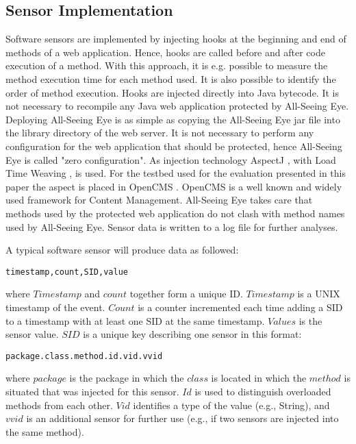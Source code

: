 \documentclass[conference]{IEEEtran}
\begin{document}
\subsection{Sensor Implementation}
Software sensors are implemented by injecting hooks at the beginning and end of methods of a web application. Hence, hooks are called before and after code execution of a method. With this approach, it is e.g. possible to measure the method execution time for each method used. It is also possible to identify the order of method execution. Hooks are injected directly into Java bytecode. It is not necessary to recompile any Java web application protected by All-Seeing Eye. Deploying All-Seeing Eye is as simple as copying the All-Seeing Eye jar file into the library directory of the web server. It is not necessary to perform any configuration for the web application that should be protected, hence All-Seeing Eye is called "zero configuration". As injection technology AspectJ \cite{aspectj_2013}, with Load Time Weaving \cite{weaving_2013}, is used. 
For the testbed used for the evaluation presented in this paper the aspect is placed in OpenCMS \cite{opencms_2013}. OpenCMS is a well known and widely used framework for Content Management.
All-Seeing Eye takes care that methods used by the protected web application do not clash with method names used by All-Seeing Eye. Sensor data is written to a log file for further analyses.

A typical software sensor will produce data as followed:

\begin{lstlisting}
timestamp,count,SID,value
\end{lstlisting}

where $Timestamp$ and $count$ together form a unique ID. $Timestamp$ is a UNIX timestamp of the event. $Count$ is a counter incremented each time adding a SID to a timestamp with at least one SID at the same timestamp. $Values$ is the sensor value. $SID$ is a unique key describing one sensor in this format:

\begin{lstlisting}
package.class.method.id.vid.vvid
\end{lstlisting}

where $package$ is the package in which the $class$ is located in which the $method$ is situated that was injected for this sensor. $Id$ is used to distinguish overloaded methods from each other. $Vid$ identifies a type of the value (e.g., String), and $vvid$ is an additional sensor for further use (e.g., if two sensors are injected into the same method).
\end{document}
